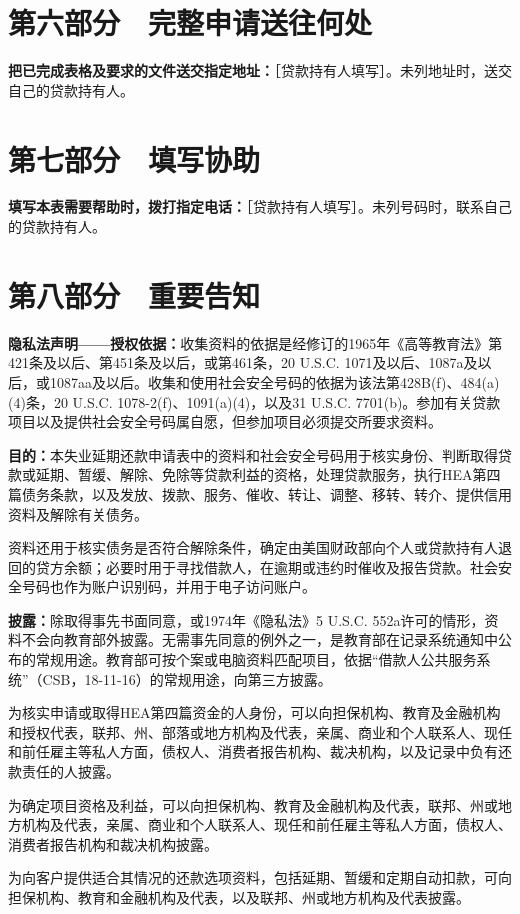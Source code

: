 \documentclass[UTF8,fontset=none,11pt,a4paper]{ctexart}
\begin{document}
\section*{第六部分　完整申请送往何处}
\textbf{把已完成表格及要求的文件送交指定地址：}［贷款持有人填写］。未列地址时，送交自己的贷款持有人。


\section*{第七部分　填写协助}
\textbf{填写本表需要帮助时，拨打指定电话：}［贷款持有人填写］。未列号码时，联系自己的贷款持有人。


\section*{第八部分　重要告知}
\textbf{隐私法声明——授权依据：}收集资料的依据是经修订的1965年《高等教育法》第421条及以后、第451条及以后，或第461条，20 U.S.C. 1071及以后、1087a及以后，或1087aa及以后。收集和使用社会安全号码的依据为该法第428B(f)、484(a)(4)条，20 U.S.C. 1078-2(f)、1091(a)(4)，以及31 U.S.C. 7701(b)。参加有关贷款项目以及提供社会安全号码属自愿，但参加项目必须提交所要求资料。


\textbf{目的：}本失业延期还款申请表中的资料和社会安全号码用于核实身份、判断取得贷款或延期、暂缓、解除、免除等贷款利益的资格，处理贷款服务，执行HEA第四篇债务条款，以及发放、拨款、服务、催收、转让、调整、移转、转介、提供信用资料及解除有关债务。


资料还用于核实债务是否符合解除条件，确定由美国财政部向个人或贷款持有人退回的贷方余额；必要时用于寻找借款人，在逾期或违约时催收及报告贷款。社会安全号码也作为账户识别码，并用于电子访问账户。


\textbf{披露：}除取得事先书面同意，或1974年《隐私法》5 U.S.C. 552a许可的情形，资料不会向教育部外披露。无需事先同意的例外之一，是教育部在记录系统通知中公布的常规用途。教育部可按个案或电脑资料匹配项目，依据“借款人公共服务系统”（CSB，18-11-16）的常规用途，向第三方披露。


为核实申请或取得HEA第四篇资金的人身份，可以向担保机构、教育及金融机构和授权代表，联邦、州、部落或地方机构及代表，亲属、商业和个人联系人、现任和前任雇主等私人方面，债权人、消费者报告机构、裁决机构，以及记录中负有还款责任的人披露。


为确定项目资格及利益，可以向担保机构、教育及金融机构及代表，联邦、州或地方机构及代表，亲属、商业和个人联系人、现任和前任雇主等私人方面，债权人、消费者报告机构和裁决机构披露。


为向客户提供适合其情况的还款选项资料，包括延期、暂缓和定期自动扣款，可向担保机构、教育和金融机构及代表，以及联邦、州或地方机构及代表披露。
\end{document}
